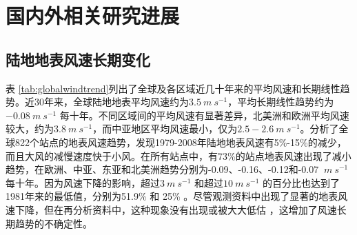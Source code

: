 \section{国内外相关研究进展}

\subsection{陆地地表风速长期变化}

表 \ref{tab:globalwindtrend}列出了全球及各区域近几十年来的平均风速和长期线性趋势。近30年来，全球陆地地表平均风速约为$3.5 ~ m ~ s^{-1}$，平均长期线性趋势约为$-0.08 ~ m ~ s^{-1}$ 每十年。不同区域间的平均风速有显著差异，北美洲和欧洲平均风速较大，约为$ 3.8 ~ m ~ s^{-1}$，而中亚地区平均风速最小，仅为$ 2.5 - 2.6 ~ m ~ s^{-1} $。\citet{vautard2010northern}分析了全球822个站点的地表风速趋势，发现1979-2008年陆地地表风速有5\%-15\%的减少，而且大风的减慢速度快于小风。在所有站点中，有73\%的站点地表风速出现了减小趋势，在欧洲、中亚、东亚和北美洲趋势分别为-0.09、-0.16、-0.12和-0.07 $ ~ m ~ s^{-1} $每十年。因为风速下降的影响，超过$3 ~ m ~ s^{-1}$ 和超过$ 10 ~ m ~ s^{-1}$ 的百分比也达到了1981年来的最低值，分别为51.9\% 和 25\% \citep{mcvicar2012land}。尽管观测资料中出现了显著的地表风速下降，但在再分析资料中，这种现象没有出现或被大大低估 \citep{vautard2010northern, stocker2013climate, torralba2017uncertainty}，这增加了风速长期趋势的不确定性。

